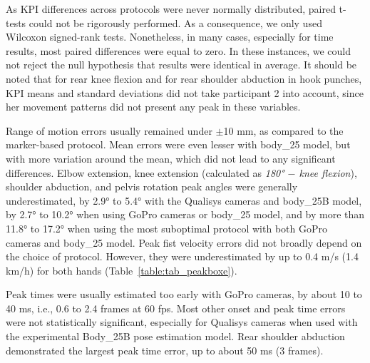As KPI differences across protocols were never normally distributed, paired t-tests could not be rigorously performed. As a consequence, we only used Wilcoxon signed-rank tests. Nonetheless, in many cases, especially for time results, most paired differences were equal to zero. In these instances, we could not reject the null hypothesis that results were identical in average. It should be noted that for rear knee flexion and for rear shoulder abduction in hook punches, KPI means and standard deviations did not take participant 2 into account, since her movement patterns did not present any peak in these variables.

\clearpage
Range of motion errors usually remained under $\pm$10 mm, as compared to the marker-based protocol. Mean errors were even lesser with body\_25 model, but with more variation around the mean, which did not lead to any significant differences. Elbow extension, knee extension (calculated as \textit{180° $-$ knee flexion}), shoulder abduction, and pelvis rotation peak angles were generally underestimated, by 2.9° to 5.4° with the Qualisys cameras and body\_25B model, by 2.7° to 10.2° when using GoPro cameras or body\_25 model, and by more than 11.8° to 17.2° when using the most suboptimal protocol with both GoPro cameras and body\_25 model. Peak fist velocity errors did not broadly depend on the choice of protocol. However, they were underestimated by up to 0.4 m/s (1.4 km/h) for both hands (Table~\ref{table:tab_peakboxe}).

Peak times were usually estimated too early with GoPro cameras, by about 10 to 40 ms, i.e., 0.6 to 2.4 frames at 60 fps. Most other onset and peak time errors were not statistically significant, especially for Qualisys cameras when used with the experimental Body\_25B pose estimation model. Rear shoulder abduction demonstrated the largest peak time error, up to about 50 ms (3 frames).

